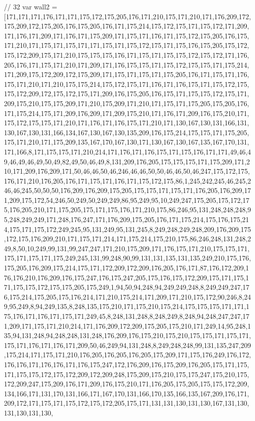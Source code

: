 // 32
var wall2 = [171,171,171,176,171,171,175,172,175,205,176,171,210,175,171,210,171,176,209,172,175,209,172,175,205,176,175,205,176,171,175,214,175,172,175,171,175,172,171,209,171,176,171,209,171,176,171,175,209,171,175,171,176,171,175,172,175,205,176,175,171,210,171,175,171,175,171,171,175,171,175,172,175,171,175,176,175,205,175,172,175,172,209,175,171,210,175,175,175,176,171,175,171,175,175,172,175,172,171,176,205,176,171,175,171,210,171,209,171,176,175,175,171,175,172,175,175,171,175,214,171,209,175,172,209,172,175,209,171,175,171,175,171,175,205,176,171,175,171,176,175,171,210,171,210,175,175,214,175,172,175,171,176,171,176,175,171,175,172,175,175,172,209,172,175,172,175,171,209,176,175,205,176,175,171,175,175,172,175,171,209,175,210,175,175,209,171,210,175,209,171,210,171,175,171,175,205,175,205,176,171,175,214,175,171,209,176,209,171,209,175,210,171,176,171,209,176,175,210,171,175,172,175,175,171,210,171,176,171,176,175,171,210,171,130,167,130,131,166,131,130,167,130,131,166,134,167,130,167,130,135,209,176,175,214,175,175,171,175,205,175,171,210,171,175,209,135,167,170,167,130,171,130,167,130,167,135,167,170,131,171,166,8,171,175,175,171,210,214,171,176,171,176,175,171,175,176,171,171,49,46,49,46,49,46,49,50,49,82,49,50,46,49,8,131,209,176,205,175,175,175,171,175,209,171,210,171,209,176,209,171,50,46,46,50,46,246,46,46,50,50,46,46,50,46,247,175,172,175,176,171,210,176,205,176,171,175,171,176,171,175,172,175,86,1,245,242,245,46,245,246,46,245,50,50,50,176,209,176,209,175,205,175,175,171,175,171,176,205,176,209,171,209,175,172,54,246,50,249,50,249,249,86,95,249,95,10,249,247,175,205,175,172,175,176,205,210,171,175,205,175,171,175,176,171,210,175,86,246,95,131,248,248,248,95,248,249,249,171,248,176,247,171,176,209,175,205,176,171,175,214,175,176,175,214,175,171,175,172,249,245,95,131,249,95,131,245,8,249,248,249,248,209,176,209,175,172,175,176,209,210,171,175,171,214,171,175,214,175,210,175,86,246,248,131,248,249,8,50,10,249,99,131,99,247,247,171,210,175,209,171,176,175,171,210,175,175,171,175,171,175,171,175,249,245,131,99,248,90,99,131,131,135,131,135,249,210,175,176,175,205,176,209,175,214,175,171,172,209,172,209,176,205,176,171,87,176,172,209,176,176,210,176,209,176,175,247,176,175,247,205,175,176,175,172,209,175,171,175,171,175,175,172,175,175,205,175,249,1,94,50,94,248,94,249,249,248,8,249,249,247,176,175,214,175,205,175,176,214,171,210,175,214,171,209,171,210,175,172,90,246,8,249,95,249,8,94,249,135,8,248,135,175,210,171,175,210,175,214,175,175,175,171,171,175,176,171,176,171,175,171,249,45,8,248,131,248,8,248,249,8,248,94,248,247,247,171,209,171,175,171,210,214,171,176,209,172,209,175,205,175,210,171,249,14,95,248,135,94,131,248,94,248,248,131,248,176,209,176,175,210,175,210,175,175,171,175,171,175,171,176,171,176,171,209,50,46,249,94,131,248,8,249,248,248,99,131,135,247,209,175,214,171,175,171,210,176,205,176,205,176,205,175,209,171,175,176,249,176,172,176,176,171,176,176,171,176,175,247,172,176,209,176,175,209,176,205,175,171,175,171,175,175,172,175,172,209,172,209,248,175,209,175,210,175,175,247,175,210,175,172,209,247,175,209,176,171,209,176,175,210,171,176,205,175,205,175,175,172,209,134,166,171,131,170,131,166,171,167,170,131,166,170,135,166,135,167,209,176,171,209,172,171,175,171,175,172,175,172,205,175,171,131,131,130,131,130,167,131,130,131,130,131,130,
